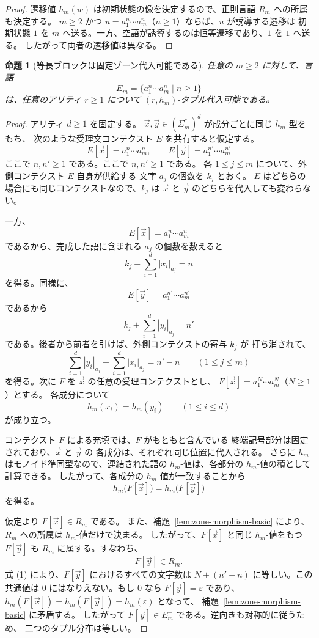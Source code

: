 \documentclass[11pt,a4paper]{ltjsarticle}
\newtheorem{proposition}[theorem]{命題}
\theoremstyle{remark}
\newcommand{\tuple}[1]{\vec{#1}}
\newcommand{\eps}{\varepsilon}
\begin{document}
\begin{proof}
遷移値 \(h_m(w)\) は初期状態の像を決定するので、正則言語 \(R_m\) への所属も決定する。
\(m\ge2\) かつ \(u=a_1^n\cdots a_m^n\)（\(n\ge1\)）ならば、\(u\) が誘導する遷移は
初期状態 \(1\) を \(m\) へ送る。一方、空語が誘導するのは恒等遷移であり、\(1\) を \(1\) へ送る。
したがって両者の遷移値は異なる。
\end{proof}

\begin{proposition}[等長ブロックは固定ゾーン代入可能である]
\label{prop:equality-block-substitutable}
任意の \(m\ge2\) に対して、言語
\[
  E_m^+=\{a_1^n\cdots a_m^n\mid n\ge1\}
\]
は、任意のアリティ \(r\ge1\) について \((r,h_m)\)-タプル代入可能である。
\end{proposition}

\begin{proof}
アリティ \(d\ge1\) を固定する。
\(\tuple x,\tuple y\in(\Sigma_m^*)^d\) が成分ごとに同じ \(h_m\)-型をもち、
次のような受理文コンテクスト \(E\) を共有すると仮定する。
\[
  E[\tuple x]=a_1^n\cdots a_m^n,
  \qquad
  E[\tuple y]=a_1^{n'}\cdots a_m^{n'}
\]
ここで \(n,n'\ge1\) である。ここで \(n,n'\ge1\) である。
各 \(1\le j\le m\) について、外側コンテクスト \(E\) 自身が供給する
文字 \(a_j\) の個数を \(k_j\) とおく。
\(E\) はどちらの場合にも同じコンテクストなので、\(k_j\) は
\(\tuple x\) と \(\tuple y\) のどちらを代入しても変わらない。

一方、
\[
  E[\tuple x]=a_1^n\cdots a_m^n
\]
であるから、完成した語に含まれる \(a_j\) の個数を数えると
\[
  k_j+\sum_{i=1}^{d}|x_i|_{a_j}=n
\]
を得る。同様に、
\[
  E[\tuple y]=a_1^{n'}\cdots a_m^{n'}
\]
であるから
\[
  k_j+\sum_{i=1}^{d}|y_i|_{a_j}=n'
\]
である。後者から前者を引けば、外側コンテクストの寄与 \(k_j\) が
打ち消されて、
\[
  \sum_{i=1}^{d}|y_i|_{a_j}
  -
  \sum_{i=1}^{d}|x_i|_{a_j}
  =n'-n
  \qquad (1\le j\le m)
  \tag{1}
\]
を得る。次に \(F\) を \(\tuple x\) の任意の受理コンテクストとし、
\(F[\tuple x]=a_1^N\cdots a_m^N\)（\(N\ge1\)）とする。
各成分について
\[
  h_m(x_i)=h_m(y_i)
  \qquad (1\le i\le d)
\]
が成り立つ。

コンテクスト \(F\) による充填では、\(F\) がもともと含んでいる
終端記号部分は固定されており、\(\tuple x\) と \(\tuple y\) の
各成分は、それぞれ同じ位置に代入される。
さらに \(h_m\) はモノイド準同型なので、連結された語の
\(h_m\)-値は、各部分の \(h_m\)-値の積として計算できる。
したがって、各成分の \(h_m\)-値が一致することから
\[
  h_m\bigl(F[\tuple x]\bigr)
  =
  h_m\bigl(F[\tuple y]\bigr)
\]
を得る。

仮定より \(F[\tuple x]\in R_m\) である。
また、補題~\ref{lem:zone-morphism-basic} により、
\(R_m\) への所属は \(h_m\)-値だけで決まる。
したがって、\(F[\tuple x]\) と同じ \(h_m\)-値をもつ
\(F[\tuple y]\) も \(R_m\) に属する。すなわち、
\[
  F[\tuple y]\in R_m .
\]
式 (1) により、\(F[\tuple y]\) におけるすべての文字数は
\(N+(n'-n)\) に等しい。この共通値は 0 にはなりえない。もし 0 なら
\(F[\tuple y]=\eps\) であり、
\(h_m(F[\tuple x])=h_m(F[\tuple y])=h_m(\eps)\) となって、
補題~\ref{lem:zone-morphism-basic} に矛盾する。
したがって \(F[\tuple y]\in E_m^+\) である。逆向きも対称的に従うため、
二つのタプル分布は等しい。
\end{proof}
\end{document}
